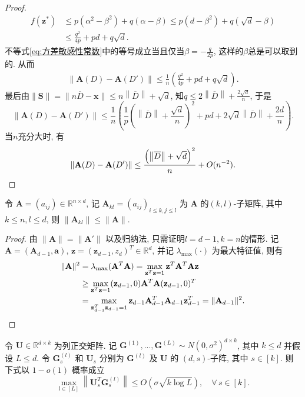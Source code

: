 \begin{proof}
  \begin{align}
    f(\mathbf{z}^*) &\le p\left(\alpha^2 - \beta^2\right) + q(\alpha - \beta) \le p\left(d - \beta^2\right) + q \left(\sqrt{d} - \beta\right) \nonumber \\
    &\le \frac{q^2}{4p} + pd + q\sqrt{d}. \label{eq:方差敏感性常数}
  \end{align}
  不等式\eqref{eq:方差敏感性常数}中的等号成立当且仅当$\beta = -\frac{q}{2p}$, 这样的$\beta$总是可以取到的. 从而
  \begin{align*}
    \|\mathbf{A}(D) - \mathbf{A}(D')\| \le \frac{1}{n} \left(\frac{q^2}{4p} + pd + q\sqrt{d}\right).
  \end{align*}
  最后由$\|\mathbf{S}\| = \|n\overline{D} - \mathbf{x}\| \le n\left\|\overline{D}\right\| + \sqrt{d}$, 知$q \le 2\left\|\overline{D}\right\| + \frac{2\sqrt{d}}{n}$, 于是
  \[
    \|\mathbf{A}(D) - \mathbf{A}(D')\| \le \frac{1}{n} \left( \frac{1}{p} \left(\left\|\overline{D}\right\| + \frac{\sqrt{d}}{n}\right)^2 + pd + 2\sqrt{d}\left\|\overline{D}\right\| + \frac{2d}{n} \right).
  \]
  当$n$充分大时, 有
  \[
    \|\mathbf{A}(D) - \mathbf{A}(D')\| \le \frac{\left(\left\|\overline{D}\right\| + \sqrt{d}\right)^2}{n} + O(n^{-2}). \qedhere
  \]
\end{proof}
\begin{lem}\label{lem:子阵范数控制}
	令 $\mathbf{A}= (a_{ij}) \in \mathbb{R}^{n\times d}$, 记 $\mathbf{A}_{kl} = (a_{ij})_{i\le k, j\le l}$ 为 $\mathbf{A}$ 的$(k, l)$-子矩阵, 其中$k\le n, l \le d$, 则 $\|\mathbf{A}_{kl}\| \le \|\mathbf{A}\|$.
\end{lem}
\begin{proof}
	由 $\|\mathbf{A}\| = \|\mathbf{A}'\|$ 以及归纳法, 只需证明$l = d - 1, k = n$的情形. 记 $\mathbf{A} = (\mathbf{A}_{d-1}, \mathbf{a})$, $\mathbf{z} = (\mathbf{z}_{d-1}, z_d)^T \in \mathbb{R}^d$,  并记 $\lambda_{\max}(\cdot)$ 为最大特征值, 则有
\begin{align*}
	\|\mathbf{A}\|^2 &= \lambda_{\max}(\mathbf{A}^T\mathbf{A}) = \max_{\mathbf{z}^T\mathbf{z} = 1} \mathbf{z}^T \mathbf{A}^T\mathbf{A}\mathbf{z} \\
	&\ge \max_{\mathbf{z}^T\mathbf{z} = 1 } (\mathbf{z}_{d-1}, 0) \mathbf{A}^T\mathbf{A}(\mathbf{z}_{d-1}, 0)^T \\
	& = \max_{\mathbf{z}_{d-1}^T\mathbf{z}_{d-1} = 1} \mathbf{z}_{d-1}\mathbf{A}_{d-1}^T \mathbf{A}_{d-1}\mathbf{z}_{d-1}^T = \|\mathbf{A}_{d-1}\|^2. \qedhere
\end{align*}
\end{proof}
\begin{lem}\label{lem:高斯凝聚性}
令 $\mathbf{U} \in \mathbb{R}^{d\times k} $ 为列正交矩阵. 记 $\mathbf{G}^{(1)},...,\mathbf{G}^{(L)} \sim N(0, \sigma^2)^{d\times k}$, 其中 $k \le d$ 并假设 $L\le d$. 令 $\mathbf{G}_s^{(l)}$ 和 $\mathbf{U}_s$ 分别为 $\mathbf{G}^{(l)}$ 及 $\mathbf{U}$ 的 $(d, s)$-子阵, 其中 $s\in[k]$. 则下式以 $1 - o(1)$ 概率成立
\begin{equation*}
\max_{l\in[L]} \left\|\mathbf{U}_s^T\mathbf{G}_s^{(l)}\right\|\le O\left(\sigma \sqrt{k\log L}\right),\quad\forall\, s\in[k].
\end{equation*}
\end{lem}
